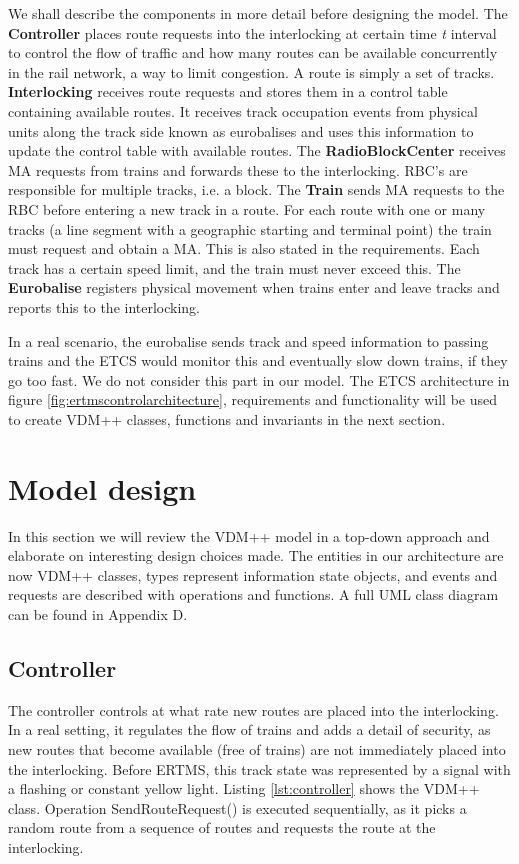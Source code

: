 \documentclass[preprint,12pt]{elsarticle}
\begin{document}
We shall describe the components in more detail before designing the model. The \textbf{Controller} places route requests into the interlocking at certain time \textit{t} interval to control the flow of traffic and how many routes can be available concurrently in the rail network, a way to limit congestion. A route is simply a set of tracks. \textbf{Interlocking} receives route requests and stores them in a control table containing available routes. It receives track occupation events from physical units along the track side known as eurobalises and uses this information to update the control table with available routes. The \textbf{RadioBlockCenter} receives MA requests from trains and forwards these to the interlocking. RBC's are responsible for multiple tracks, i.e. a block. The \textbf{Train} sends MA requests to the RBC before entering a new track in a route. For each route with one or many tracks (a line segment with a geographic starting and terminal point) the train must request and obtain a MA. This is also stated in the requirements. Each track has a certain speed limit, and the train must never exceed this. The \textbf{Eurobalise} registers physical movement when trains enter and leave tracks and reports this to the interlocking. 

In a real scenario, the eurobalise sends track and speed information to passing trains and the ETCS would monitor this and eventually slow down trains, if they go too fast. We do not consider this part in our model. The ETCS architecture in figure \ref{fig:ertmscontrolarchitecture}, requirements and functionality will be used to create VDM++ classes, functions and invariants in the next section.

\section{Model design}

In this section we will review the VDM++ model in a top-down approach and elaborate on interesting design choices made. The entities in our architecture are now VDM++ classes, types represent information state objects, and events and requests are described with operations and functions. A full UML class diagram can be found in Appendix D.

\subsection{Controller}

The controller controls at what rate new routes are placed into the interlocking. In a real setting, it regulates the flow of trains and adds a detail of security, as new routes that become available (free of trains) are not immediately placed into the interlocking. Before ERTMS, this track state was represented by a signal with a flashing or constant yellow light. Listing \ref{lst:controller} shows the VDM++ class. Operation SendRouteRequest() is executed sequentially, as it picks a random route from a sequence of routes and requests the route at the interlocking.
\end{document}
